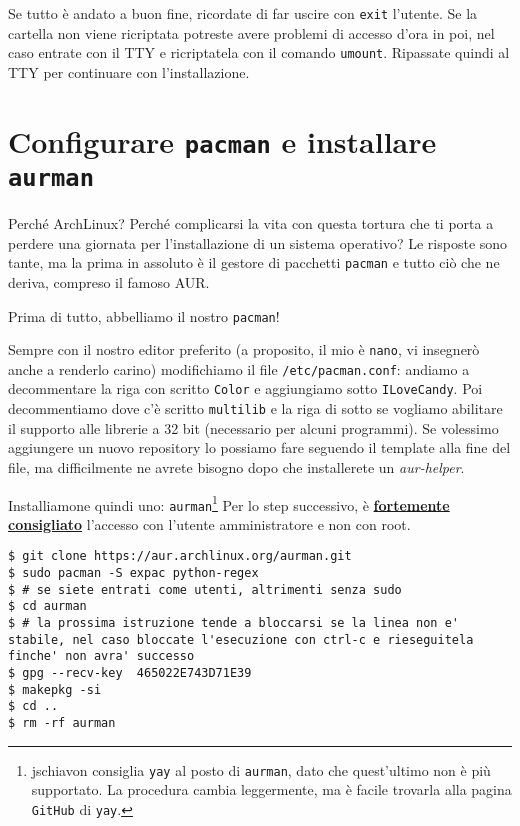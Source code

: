 \documentclass[twoside,italian]{book}
\newcommand{\code}[1]{\texttt{#1}}
\newcommand{\arch}{ArchLinux}
\begin{document}
    Se tutto è andato a buon fine, ricordate di far uscire con \code{exit} l'utente. Se la cartella non viene ricriptata potreste avere problemi di accesso d'ora in poi, nel caso entrate con il \ac{TTY} e ricriptatela con il comando \code{umount}.
    Ripassate quindi al \ac{TTY} per continuare con l'installazione.

\section{Configurare \code{pacman} e installare \code{aurman}}

    Perché \arch? Perché complicarsi la vita con questa tortura che ti porta a perdere una giornata per l'installazione di un sistema operativo? Le risposte sono tante, ma la prima in assoluto è il gestore di pacchetti \code{pacman} e tutto ciò che ne deriva, compreso il famoso \ac{AUR}.

    Prima di tutto, abbelliamo il nostro \code{pacman}!
    
    Sempre con il nostro editor preferito (a proposito, il mio è \code{nano}, vi insegnerò anche a renderlo carino) modifichiamo il file \code{/etc/pacman.conf}: andiamo a decommentare la riga con scritto \code{Color} e aggiungiamo sotto \code{ILoveCandy}.
    Poi decommentiamo dove c'è scritto \code{multilib} e la riga di sotto se vogliamo abilitare il supporto alle librerie a 32 bit (necessario per alcuni programmi).
    Se volessimo aggiungere un nuovo repository lo possiamo fare seguendo il template alla fine del file, ma difficilmente ne avrete bisogno dopo che installerete un \textit{aur-helper}.

    Installiamone quindi uno: \code{aurman}\footnote{jschiavon consiglia \code{yay} al posto di \code{aurman}, dato che quest'ultimo non è più supportato. La procedura cambia leggermente, ma è facile trovarla alla pagina \code{GitHub} di \code{yay}.}
    Per lo step successivo, è \underline{\textbf{fortemente consigliato}} l'accesso con l'utente amministratore e non con root.

\begin{lstlisting}
$ git clone https://aur.archlinux.org/aurman.git
$ sudo pacman -S expac python-regex
$ # se siete entrati come utenti, altrimenti senza sudo
$ cd aurman
$ # la prossima istruzione tende a bloccarsi se la linea non e' stabile, nel caso bloccate l'esecuzione con ctrl-c e rieseguitela finche' non avra' successo
$ gpg --recv-key  465022E743D71E39
$ makepkg -si
$ cd ..
$ rm -rf aurman
\end{lstlisting}
\end{document}
